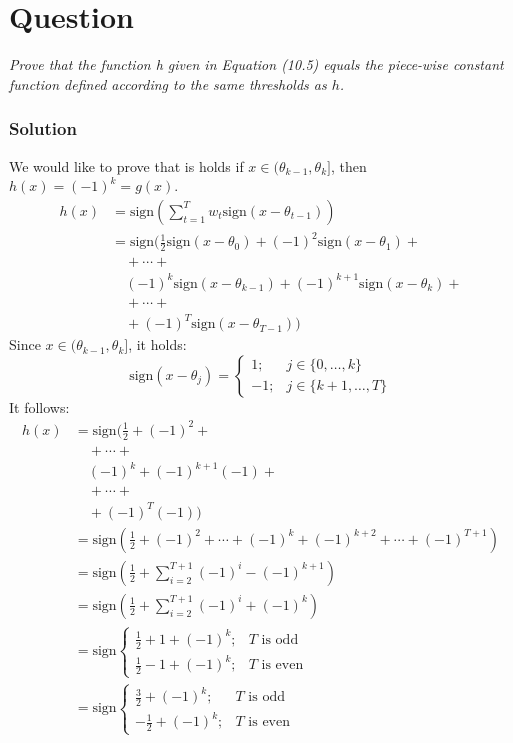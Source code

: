 \documentclass{article}
\newcommand{\sign}{\text{sign}}
\newcounter{counterquestion}
\newenvironment{question}[1]
{
\stepcounter{counterquestion}
\section*{Question \thecounterquestion}
\emph{#1} 
} 
{
}
\newenvironment{solution}
{
\subsubsection*{Solution}
} 
{
}
\begin{document}
\begin{question}{Prove that the function h given in Equation (10.5) equals the piece-wise constant function defined according to the same thresholds as $h$.}
\begin{solution}
We would like to prove that is holds if $x \in (\theta_{k -1}, \theta_k]$, then $h(x) = (-1)^k = g(x)$.
\begin{align*}
h(x) & = \sign \left( \sum_{t = 1}^{T} w_t \sign(x - \theta_{t - 1}) \right) \\
& = \sign ( \frac{1}{2} \sign(x - \theta_0) + (-1)^2 \sign(x - \theta_1) + \\
& \quad + \cdots + \\
& \quad (-1)^k \sign(x - \theta_{k-1}) + (-1)^{k + 1} \sign(x - \theta_k) + \\
& \quad + \cdots + \\
& \quad + (-1)^T \sign(x - \theta_{T-1}) )
\end{align*}
Since $x \in (\theta_{k -1}, \theta_k]$, it holds:
\[
\sign(x - \theta_j) =
\begin{cases}
1; & j \in \{ 0, \dots, k \} \\
- 1; & j \in \{ k + 1, \dots, T \}
\end{cases}
\]
It follows:
\begin{align*}
h(x) & = \sign ( \frac{1}{2} + (-1)^2 + \\
& \quad + \cdots + \\
& \quad (-1)^k + (-1)^{k + 1} (-1) + \\
& \quad + \cdots + \\
& \quad + (-1)^T (-1) ) \\
& = \sign \left( \frac{1}{2} + (-1)^2 + \cdots + (-1)^k + (-1)^{k + 2} + \cdots + (-1)^{T + 1} \right) \\
& = \sign \left( \frac{1}{2} + \sum_{i = 2}^{T + 1} (-1)^i - (-1)^{k + 1} \right) \\
& = \sign \left( \frac{1}{2} + \sum_{i = 2}^{T + 1} (-1)^i + (-1)^{k} \right) \\
& = \sign
\begin{cases}
\frac{1}{2} + 1 + (-1)^{k}; & T \text{ is odd} \\
\frac{1}{2} - 1 + (-1)^{k}; & T \text{ is even}
\end{cases} \\
& = \sign
\begin{cases}
\frac{3}{2} + (-1)^{k}; & T \text{ is odd} \\
- \frac{1}{2} + (-1)^{k}; & T \text{ is even}

\end{cases}
\end{align*}
\end{solution}
\end{question}
\end{document}
